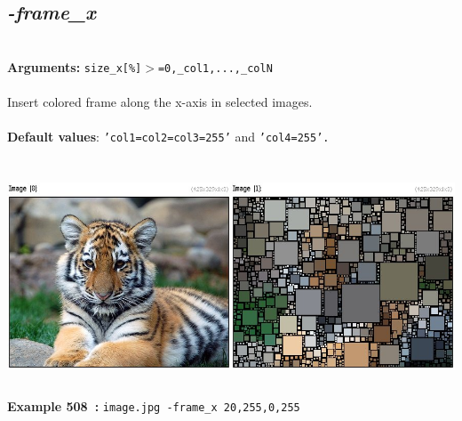 \documentclass[a4paper,11pt,twoside]{book}
\begin{document}
\subsection{\emph{-frame\_x} }\vspace*{-0.5em}
~\\\textbf{Arguments: } 
{\small \texttt{size\_x[\%]$>$=0,\_col1,...,\_colN}}\\~\\
Insert colored frame along the x-axis in selected images.
~\\~\\\textbf{Default values}: {\small \texttt{'col1=col2=col3=255'} and \texttt{'col4=255'.}}
\begin{center}\includegraphics[keepaspectratio=true,height=7cm,width=\textwidth]{img/gmic_def508.jpg}\\
{\footnotesize \textbf{Example 508~:} \texttt{image.jpg -frame\_x 20,255,0,255}}
\end{center}
\end{document}
